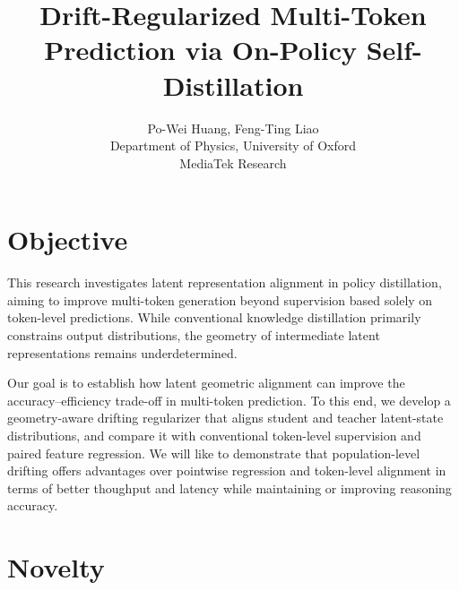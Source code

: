 \documentclass{article}
\title{Drift-Regularized Multi-Token Prediction via On-Policy Self-Distillation}
\author{%
  Po-Wei Huang, Feng-Ting Liao \\
  Department of Physics, University of Oxford \\
  MediaTek Research
}
\begin{document}
\maketitle



\section{Objective}
\label{sec:objective}

This research investigates latent representation alignment in
policy distillation, aiming to improve multi-token generation
beyond supervision based solely on token-level predictions.
While conventional knowledge distillation primarily constrains
output distributions, the geometry of intermediate latent
representations remains underdetermined.


Our goal is to establish how latent geometric alignment
can improve the accuracy--efficiency trade-off in
multi-token prediction. To this end, we develop a
geometry-aware drifting regularizer that aligns student
and teacher latent-state distributions, and compare it
with conventional token-level supervision and paired
feature regression. We will like to demonstrate that population-level drifting offers advantages over pointwise regression and token-level alignment in terms of better thoughput and latency while maintaining or improving reasoning accuracy. 




\section{Novelty}
\label{sec:novelty}
\end{document}
